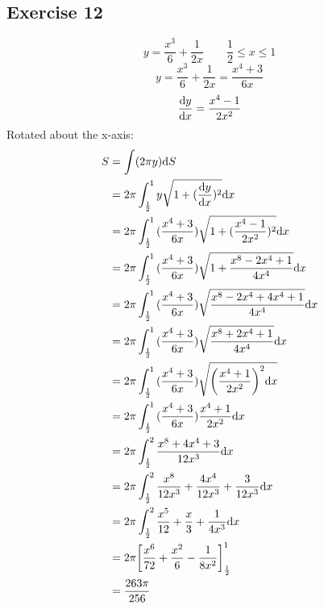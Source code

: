\documentclass[letterpaper, 12pt]{math}
\begin{document}
\subsection*{Exercise 12}
\[ y = \frac{x^{3}}{6}+\frac{1}{2x} \quad \quad \frac{1}{2} \leq x \leq 1 \]
\[ y = \frac{x^{3}}{6}+\frac{1}{2x} = \frac{x^{4}+3}{6x} \]
\[ \frac{\mathrm{d}{y}}{\mathrm{d}{x}} = \frac{x^{4}-1}{2x^{2}} \]
Rotated about the x-axis:
\begin{align*}
  S &= \int(2\pi y)\mathrm{d}{S} \\
  &= 2\pi\int_{\frac{1}{2}}^{1}{
    y\sqrt{1+(\frac{\mathrm{d}{y}}{\mathrm{d}{x}})^{2}}\mathrm{d}{x}} \\
  &= 2\pi\int_{\frac{1}{2}}^{1}{(\frac{x^{4}+3}{6x})
    \sqrt{1+(\frac{x^{4}-1}{2x^{2}})^{2}}\mathrm{d}{x}} \\
  &= 2\pi\int_{\frac{1}{2}}^{1}{(\frac{x^{4}+3}{6x})
    \sqrt{1+\frac{x^{8}-2x^{4}+1}{4x^{4}}}\mathrm{d}{x}} \\
  &= 2\pi\int_{\frac{1}{2}}^{1}{(\frac{x^{4}+3}{6x})
    \sqrt{\frac{x^{8}-2x^{4}+4x^{4}+1}{4x^{4}}}\mathrm{d}{x}} \\
  &= 2\pi\int_{\frac{1}{2}}^{1}{(\frac{x^{4}+3}{6x})
    \sqrt{\frac{x^{8}+2x^{4}+1}{4x^{4}}}\mathrm{d}{x}} \\
  &= 2\pi\int_{\frac{1}{2}}^{1}{(\frac{x^{4}+3}{6x})
    \sqrt{\bigg(\frac{x^{4}+1}{2x^{2}}\bigg)^{2}\mathrm{d}{x}}} \\
  &= 2\pi\int_{\frac{1}{2}}^{1}{(\frac{x^{4}+3}{6x})
    \frac{x^{4}+1}{2x^{2}}\mathrm{d}{x}} \\
  &= 2\pi\int_{\frac{1}{2}}^{2}{\frac{x^{8}+4x^{4}+3}{12x^{3}}\mathrm{d}{x}} \\
  &= 2\pi\int_{\frac{1}{2}}^{2}{
    \frac{x^{8}}{12x^{3}}+\frac{4x^{4}}{12x^{3}}+\frac{3}{12x^{3}}\mathrm{d}{x}} \\
  &= 2\pi\int_{\frac{1}{2}}^{2}{
    \frac{x^{5}}{12}+\frac{x}{3}+\frac{1}{4x^{3}}\mathrm{d}{x}} \\
  &= 2\pi\bigg[\frac{x^{6}}{72}+\frac{x^{2}}{6}-\frac{1}{8x^{2}}\bigg]
    _{\frac{1}{2}}^{1} \\
  &= \frac{263\pi}{256}
\end{align*}
\end{document}
